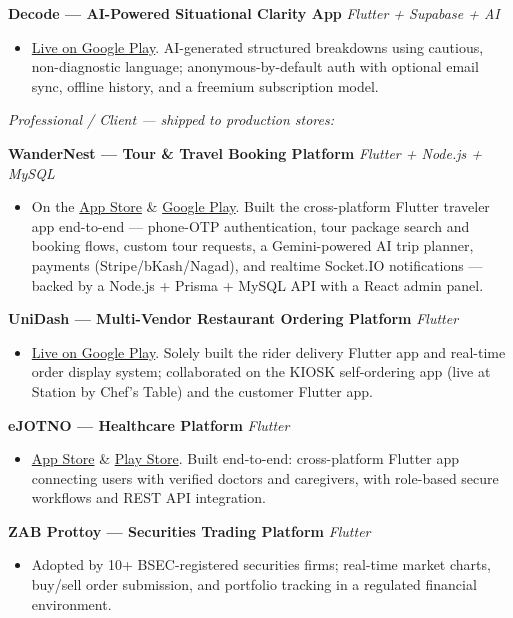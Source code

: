 \documentclass[a4paper,10pt]{article}
\newcommand{\smallgap}{\vspace{1pt}}
\newcommand{\project}[2]{%
  \smallgap
  \noindent\textbf{#1} \hfill \textit{#2}\par
}
\begin{document}
\project{Decode --- AI-Powered Situational Clarity App}{Flutter + Supabase + AI}
\begin{itemize}
  \item \href{https://play.google.com/store/apps/details?id=com.mtrs.decode}{Live on Google Play}. AI-generated structured breakdowns using cautious, non-diagnostic language; anonymous-by-default auth with optional email sync, offline history, and a freemium subscription model.
\end{itemize}

\smallgap
\textit{Professional / Client --- shipped to production stores:}
\smallgap

\project{WanderNest --- Tour \& Travel Booking Platform}{Flutter + Node.js + MySQL}
\begin{itemize}
  \item On the \href{https://apps.apple.com/us/app/wandernest/id6785061278}{App Store} \& \href{https://play.google.com/store/apps/details?id=com.binaryans.wandernest}{Google Play}. Built the cross-platform Flutter traveler app end-to-end --- phone-OTP authentication, tour package search and booking flows, custom tour requests, a Gemini-powered AI trip planner, payments (Stripe/bKash/Nagad), and realtime Socket.IO notifications --- backed by a Node.js + Prisma + MySQL API with a React admin panel.
\end{itemize}

\project{UniDash --- Multi-Vendor Restaurant Ordering Platform}{Flutter}
\begin{itemize}
  \item \href{https://play.google.com/store/apps/details?id=com.unidash360byOSL.unidash_app}{Live on Google Play}. Solely built the rider delivery Flutter app and real-time order display system; collaborated on the KIOSK self-ordering app (live at Station by Chef's Table) and the customer Flutter app.
\end{itemize}

\project{eJOTNO --- Healthcare Platform}{Flutter}
\begin{itemize}
  \item \href{https://apps.apple.com/us/app/ejotno/id6741751239}{App Store} \& \href{https://play.google.com/store/apps/details?id=com.osl.ejotno}{Play Store}. Built end-to-end: cross-platform Flutter app connecting users with verified doctors and caregivers, with role-based secure workflows and REST API integration.
\end{itemize}

\project{ZAB Prottoy --- Securities Trading Platform}{Flutter}
\begin{itemize}
  \item Adopted by 10+ BSEC-registered securities firms; real-time market charts, buy/sell order submission, and portfolio tracking in a regulated financial environment.
\end{itemize}
\end{document}
